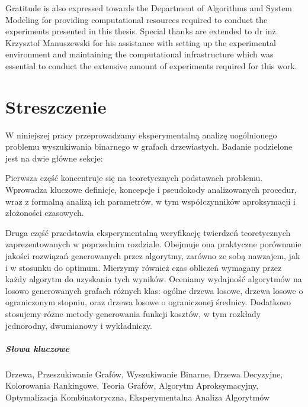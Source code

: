Gratitude is also expressed towards the Department of Algorithms and System Modeling for providing computational resources required to conduct the experiments presented in this thesis. Special thanks are extended to dr inż. Krzysztof Manuszewski for his assistance with setting up the experimental environment and maintaining the computational infrastructure which was essential to conduct the extensive amount of experiments required for this work.

\newpage

\chapter*{Streszczenie}

W niniejszej pracy przeprowadzamy eksperymentalną analizę uogólnionego problemu wyszukiwania binarnego w grafach drzewiastych. Badanie podzielone jest na dwie główne sekcje:

Pierwsza część koncentruje się na teoretycznych podstawach problemu. Wprowadza kluczowe definicje, koncepcje i pseudokody analizowanych procedur, wraz z formalną analizą ich parametrów, w tym współczynników aproksymacji i złożoności czasowych.

Druga część przedstawia eksperymentalną weryfikację twierdzeń teoretycznych zaprezentowanych w poprzednim rozdziale. Obejmuje ona praktyczne porównanie jakości rozwiązań generowanych przez algorytmy, zarówno ze sobą nawzajem, jak i w stosunku do optimum. Mierzymy również czas obliczeń wymagany przez każdy algorytm do uzyskania tych wyników. Oceniamy wydajność algorytmów na losowo generowanych grafach różnych klas: ogólne drzewa losowe, drzewa losowe o ograniczonym stopniu, oraz drzewa losowe o ograniczonej średnicy. Dodatkowo stosujemy różne metody generowania funkcji kosztów, w tym rozkłady jednorodny, dwumianowy i wykładniczy.

\paragraph{Słowa kluczowe} Drzewa, Przeszukiwanie Grafów, Wyszukiwanie Binarne, Drzewa Decyzyjne, Kolorowania Rankingowe, Teoria Grafów, Algorytm Aproksymacyjny, Optymalizacja Kombinatoryczna, Eksperymentalna Analiza Algorytmów


